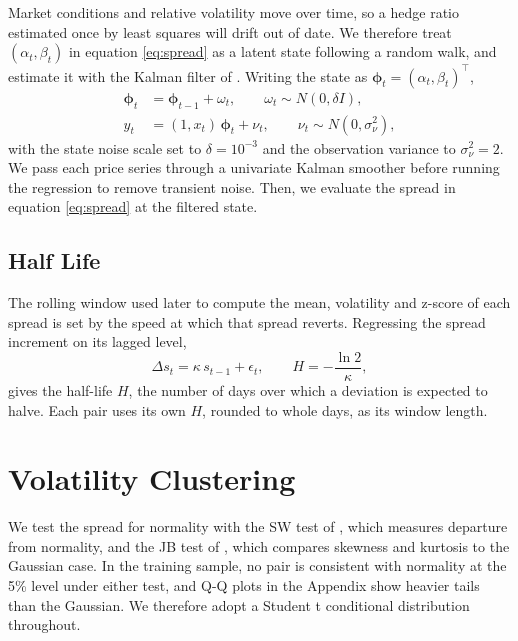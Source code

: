\documentclass[11pt]{article}
\begin{document}
Market conditions and relative volatility move over time, so a hedge ratio estimated once by least squares will drift out of date. We therefore treat $(\alpha_t, \beta_t)$ in equation \eqref{eq:spread} as a latent state following a random walk, and estimate it with the Kalman filter of \citet{kalman1960}. Writing the state as $\boldsymbol{\phi}_t = (\alpha_t, \beta_t)^\top$,
\begin{equation}
\begin{aligned}
\boldsymbol{\phi}_t &= \boldsymbol{\phi}_{t-1} + \omega_t, \qquad \omega_t \sim N(0, \delta I), \\
y_t &= (1, x_t)\, \boldsymbol{\phi}_t + \nu_t, \qquad \nu_t \sim N(0, \sigma_\nu^2),
\end{aligned}
\end{equation}
with the state noise scale set to $\delta = 10^{-3}$ and the observation variance to $\sigma_\nu^2 = 2$. We pass each price series through a univariate Kalman smoother before running the regression to remove transient noise. Then, we evaluate the spread in equation \eqref{eq:spread} at the filtered state.

\subsection{Half Life}

The rolling window used later to compute the mean, volatility and z-score of each spread is set by the speed at which that spread reverts. Regressing the spread increment on its lagged level,
\begin{equation}
\Delta s_t = \kappa\, s_{t-1} + \epsilon_t, \qquad H = -\frac{\ln 2}{\kappa},
\end{equation}
gives the half-life $H$, the number of days over which a deviation is expected to halve. Each pair uses its own $H$, rounded to whole days, as its window length.

\section{Volatility Clustering}

We test the spread for normality with the SW test of \citet{shapiro1965}, which measures departure from normality, and the JB test of \citet{jarque1980}, which compares skewness and kurtosis to the Gaussian case. In the training sample, no pair is consistent with normality at the 5\% level under either test, and Q-Q plots in the Appendix show heavier tails than the Gaussian. We therefore adopt a Student t conditional distribution throughout.
\end{document}
